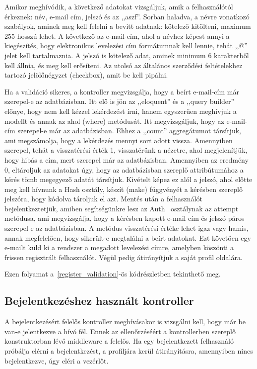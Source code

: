 \documentclass[
]{thesis-ekf}
\theoremstyle{definition}
\theoremstyle{remark}
\begin{document}
	Amikor meghívódik, a következő adatokat vizsgáljuk, amik a felhasználótól érkeznek: név, e-mail cím, jelszó és az ,,aszf''.
	Sorban haladva, a névre vonatkozó szabályok, aminek meg kell felelni a bevitt adatnak: kötelező kitölteni, maximum 255 hosszú lehet. A következő az e-mail-cím, ahol a névhez képest annyi a kiegészítés, hogy elektronikus levelezési cím formátumnak kell lennie, tehát ,,@'' jelet kell tartalmaznia.
	A jelszó is kötelező adat, aminek minimum 6 karakterből kell állnia, és meg kell erősíteni. Az utolsó az általános szerződési feltételekhez tartozó jelölőnégyzet (checkbox), amit be kell pipálni.
	
	Ha a validáció sikeres, a kontroller megvizsgálja, hogy a beírt e-mail-cím már szerepel-e az adatbázisban. Itt elő is jön az ,,eloquent'' és a ,,query builder'' előnye, hogy nem kell kézzel lekérdezést írni, hanem egyszerűen meghívjuk a modellt és annak az ahol (where) metódusát. Itt megvizsgáljuk, hogy az e-mail-cím szerepel-e már az adatbázisban. Ehhez a ,,count'' aggregátumot társítjuk, ami megszámolja, hogy a lekérdezés mennyi sort adott vissza. Amennyiben szerepel, tehát a visszatérési érték 1, visszatérünk a nézetre, ahol megjelenítjük, hogy hibás a cím, mert szerepel már az adatbázisban. Amennyiben az eredmény 0, eltároljuk az adatokat úgy, hogy az adatbázisban szereplő attribútumához a kérés tömb megegyező adatát társítjuk. Kivételt képez ez
	alól a jelszó, ahol előtte meg kell hívnunk a Hash osztály, készít (make) függvényét a
	kérésben szereplő jelszóra, hogy kódolva tároljuk el azt. Mentés után a felhasználót bejelentkeztetjük, amiben segítségünkre lesz az Auth~\cite{laravel_auth} osztálynak az attempt metódusa, ami megvizsgálja, hogy a kérésben kapott e-mail cím és jelszó páros szerepel-e az adatbázisban. A metódus visszatérési értéke lehet igaz vagy hamis, annak megfelelően, hogy sikerült-e megtalálni a beírt adatokat. Ezt követően egy e-mailt küld ki a rendszer a megadott levelezési címre, amelyben köszönti a frissen regisztrált felhasználót. Végül pedig átirányítjuk a saját profil oldalára.
	
	Ezen folyamat a~\ref{register_validation}-ös kódrészletben tekinthető meg.
	
	
	
	\subsection{Bejelentkezéshez használt kontroller}
	A bejelentkezésért felelős kontroller meghívásakor is vizsgálni kell, hogy már be van-e jelentkezve a hívó fél. Ennek az ellenőrzéséért a kontrollerben szereplő konstruktorban lévő middleware a felelős. Ha egy bejelentkezett felhasználó próbálja elérni a bejelentkezést, a profiljára kerül átirányításra, amennyiben nincs bejelentkezve, úgy eléri a vezérlőt.
	
\end{document}
